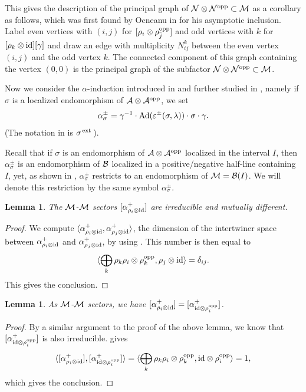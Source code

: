 \documentclass[12pt]{article}
\def\lan{\langle}
\def\ran{\rangle}
\def\Ad{{\hbox{\rm Ad}}}
\def\id{{\rm id}}
\def\o{{\rm opp}}
\def\a{\alpha}
\def\de{\delta}
\def\e{\varepsilon}
\def\ga{\gamma}
\newtheorem{lemma}[theorem]{Lemma}
\def\A{{\cal A}}
\def\B{{\cal B}}
\def\N{{\cal N}}
\def\M{{\cal M}}
\def\ext{\,{\rm ext}\,}
\def\AA{{\A\otimes \A^{\rm opp}}}
\begin{document}
This gives the description of the principal graph of 
$\N\otimes\N^\o\subset \M$ as a corollary as follows, which was first 
found by Ocneanu in \cite{O2} for his asymptotic inclusion.  Label 
even vertices with $(i,j)$ for $[\rho_i\otimes\rho_{\bar j}^\o]$ and 
odd vertices with $k$ for $[\rho_k\otimes\id][\ga]$ and draw an edge 
with multiplicity $N_{ij}^k$ between the even vertex $(i,j)$ and the 
odd vertex $k$.  The connected component of this graph containing the 
vertex $(0,0)$ is the principal graph of the subfactor 
$\N\otimes\N^\o\subset \M$.

Now we consider the $\a$-induction introduced in \cite{LR} and further 
studied in \cite{X1, BE}, namely if $\sigma$ is a localized 
endomorphism of $\AA$, we set 
\begin{equation} 
\a^\pm_{\sigma}= 
\ga^{-1}\cdot\Ad(\e^\pm(\sigma,\lambda))\cdot\sigma\cdot\ga.  
\label{induction} 
\end{equation} 
(The notation in \cite{LR} is $\sigma^{\ext}$).

Recall that if $\sigma$ is an endomorphism of $\AA$
localized in the interval $I$, then
$\a^\pm_{\sigma}$ is an endomorphism of $\B$ localized
in a positive/negative half-line containing
$I$, yet, as shown in \cite[I]{BE}, $\a^\pm_{\sigma}$ restricts to an
endomorphism of $\M=\B(I)$. We will denote this restriction
by the same symbol $\a^\pm_{\sigma}$.
\begin{lemma}
\label{LL12}
The $\M$-$\M$ sectors $[\a^+_{\rho_i\otimes\id}]$ are irreducible
and  mutually different.
\end{lemma}

\begin{proof}
We compute
$\lan \a^+_{\rho_i\otimes\id}, \a^+_{\rho_j\otimes\id}\ran$, the
dimension of the intertwiner space between
$\a^+_{\rho_i\otimes\id}$
and $\a^+_{\rho_j\otimes\id}$, by using
\cite[I, Theorem 3.9]{BE}.  This number is then equal to
$$\lan \bigoplus_k \rho_k\rho_i\otimes\rho_k^\o,\rho_j\otimes\id\ran
=\de_{ij}.$$
This gives the conclusion.
\end{proof}

\begin{lemma}
\label{LL13}
As $\M$-$\M$ sectors, we have
$[\a^+_{\rho_i\otimes\id}]
=[\a^+_{\id\otimes\rho_i^\o}]$.
\end{lemma}

\begin{proof}
By a similar argument to the proof of the above lemma, we know
that $[\a^+_{\id\otimes\rho_i^\o}]$ is also irreducible.
\cite[I, Theorem 3.9]{BE} gives
$$\lan [\a^+_{\rho_i\otimes\id}],
[\a^+_{\id\otimes\rho_i^\o}]\ran=
\lan \bigoplus_k \rho_k\rho_i\otimes\rho_k^\o,\id\otimes\rho_i^\o\ran
=1,$$
which gives the conclusion.
\end{proof}
\end{document}
